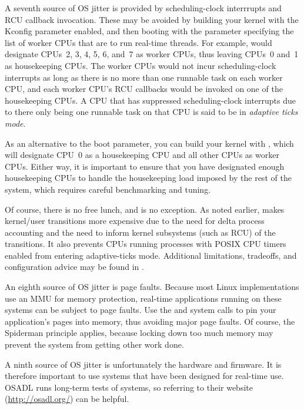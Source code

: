A seventh source of OS jitter is provided by
scheduling-clock interrrupts and RCU callback invocation.
These may be avoided by building your kernel with the
 Kconfig parameter enabled, and then booting
with the  parameter specifying the list of
worker CPUs that are to run real-time threads.
For example,  would designate CPUs~2, 3, 4, 5, 6, and~7
as worker CPUs, thus leaving CPUs~0 and~1 as housekeeping CPUs.
The worker CPUs would not incur scheduling-clock interrupts as long
as there is no more than one runnable task on each worker CPU,
and each worker CPU's RCU callbacks would be invoked on one of the
housekeeping CPUs.
A CPU that has suppressed scheduling-clock interrupts due to there
only being one runnable task on that CPU is said to be in
\emph{adaptive ticks mode}.

As an alternative to the  boot parameter, you can build
your kernel with , which will designate CPU~0 as
a housekeeping CPU and all other CPUs as worker CPUs.
Either way, it is important to ensure that you have designated enough
housekeeping CPUs to handle the housekeeping load imposed by the
rest of the system, which requires careful benchmarking and tuning.

Of course, there is no free lunch, and  is no exception.
As noted earlier,
 makes kernel/user transitions more expensive due to the
need for delta process accounting and the need to inform kernel subsystems
(such as RCU) of the transitions.
It also prevents CPUs running processes with POSIX CPU timers enabled
from entering adaptive-ticks mode.
Additional limitations, tradeoffs, and configuration advice may be
found in .

An eighth source of OS jitter is page faults.
Because most Linux implementations use an MMU for memory protection,
real-time applications running on these systems can be subject
to page faults.
Use the  and  system calls to pin your
application's pages into memory, thus avoiding major page faults.
Of course, the Spiderman principle applies, because locking down
too much memory may prevent the system from getting other work done.

A ninth source of OS jitter is unfortunately the hardware and firmware.
It is therefore important to use systems that have been designed for
real-time use.
OSADL runs long-term tests of systems, so referring to their
website (\url{http://osadl.org/}) can be helpful.

